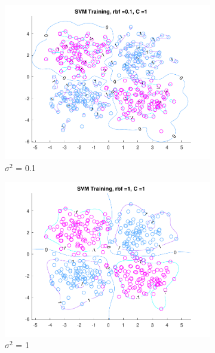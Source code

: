 \begin{figure}[h!]
\centering
    \begin{subfigure}[b]{0.22\textwidth}
	\includegraphics[scale=0.4]{figures/hw2_2_nonsep_rbf_0_1_a_1.pdf}
	\caption{$\sigma^2$ = 0.1}\label{fig:svm_data_stdev1a}
    \end{subfigure}
    \quad
    \begin{subfigure}[b]{0.22\textwidth}
	\includegraphics[scale=0.4]{figures/hw2_2_nonsep_rbf_1_a_1.pdf}
	\caption{$\sigma^2$ = 1}\label{fig:svm_data_stdev2a}
    \end{subfigure}
    \quad
    \begin{subfigure}[b]{0.22\textwidth}

\end{subfigure}
\end{figure}
